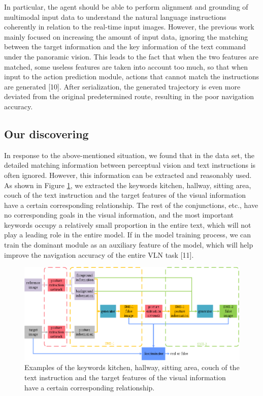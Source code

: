 In particular, the agent should be able to perform alignment and grounding of multimodal input data to understand the natural language instructions coherently in relation to the real-time input images. However, the previous work mainly focused on increasing the amount of input data, ignoring the matching between the target information and the key information of the text command under the panoramic vision. This leads to the fact that when the two features are matched, some useless features are taken into account too much, so that when input to the action prediction module, actions that cannot match the instructions are generated [10]. After serialization, the generated trajectory is even more deviated from the original predetermined route, resulting in the poor navigation accuracy.

\subsection{Our discovering}	

In response to the above-mentioned situation, we found that in the data set, the detailed matching information between perceptual vision and text instructions is often ignored. However, this information can be extracted and reasonably used. As shown in Figure \ref{image02}, we extracted the keywords kitchen, hallway, sitting area, couch of the text instruction and the target features of the visual information have a certain corresponding relationship. The rest of the conjunctions, etc., have no corresponding goals in the visual information, and the most important keywords occupy a relatively small proportion in the entire text, which will not play a leading role in the entire model. If in the model training process, we can train the dominant module as an auxiliary feature of the model, which will help improve the navigation accuracy of the entire VLN task [11].

\begin{figure}
	\centering
	\includegraphics[scale=1]{image02.png}
	\caption{Examples of the keywords kitchen, hallway, sitting area, couch of the text instruction and the target features of the visual information have a certain corresponding relationship.}
	\label{image02}
\end{figure}
